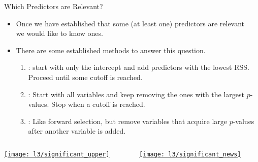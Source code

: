 \documentclass[mathserif, aspectratio=169]{beamer}
\begin{document}
\begin{frame}{Which Predictors are Relevant?}
	\begin{itemize}
		\item Once we have established that some (at least one) predictors are relevant\\
			we would like to know  ones.
		\item There are some established methods to answer this question.
			\begin{cpage}
				\begin{enumerate}
					\item {}: start with only the intercept and add
						predictors with the lowest RSS. Proceed until some cutoff is reached. 
					\item {}: Start with all variables and keep removing
						the ones with the largest $p$-values. Stop when a cutoff is reached.
					\item {}: Like forward selection, but remove variables
						that acquire large $p$-values after another variable is added.
				\end{enumerate}
			\end{cpage}
	\end{itemize}
\end{frame}

\begin{frame}[plain]
	\begin{columns}
		\begin{column}{0.6\textwidth}
			\vspace{-3mm}
			\begin{center}
				\href{https://www.xkcd.com/882/}{\texttt{[image: l3/significant\_upper]}}
			\end{center}
		\end{column}
		\begin{column}{0.4\textwidth}
			\href{https://www.xkcd.com/882/}{\texttt{[image: l3/significant\_news]}}
		\end{column}
	\end{columns}
\end{frame}
\end{document}
